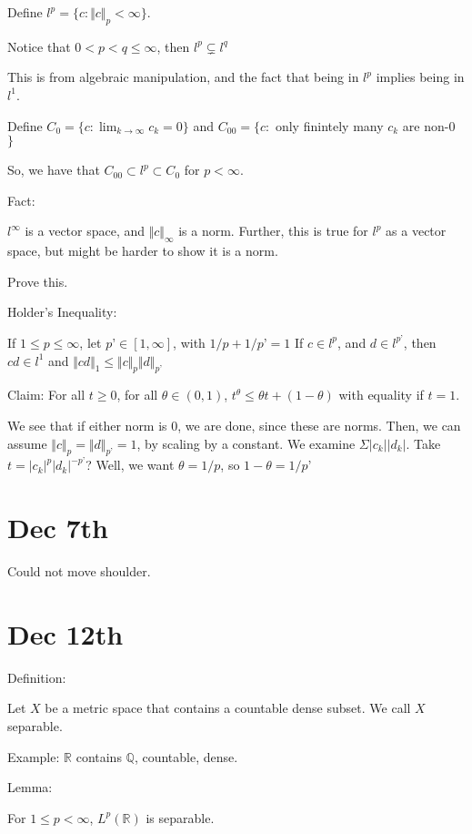 \documentclass[10pt]{article}
\begin{document}
Define $l^p = \{ c : \Vert c \Vert_p < \infty \}$.

Notice that $0 < p < q \leq \infty$, then $l^p \subsetneq l^q$

This is from algebraic manipulation, and the fact that being in $l^p$ implies being in $l^1$.

Define $C_0 = \{ c : \lim_{k \to \infty} c_k = 0\}$ and $C_{00} = \{ c : $ only finintely many $c_k$ are non-0 $\}$

So, we have that $C_{00} \subset l^p \subset C_0$ for $p < \infty$.

Fact:

$l^\infty$ is a vector space, and $\Vert c \Vert_\infty$ is a norm. Further, this is true for $l^p$ as a vector space, but might be harder to show it is a norm.

Prove this.

Holder’s Inequality:

If $1 \leq p \leq \infty$, let $p’ \in [1,\infty]$, with $1/p + 1/p’ = 1$ If $c \in l^p$, and $d \in l^{p’}$, then $cd \in l^1$ and $\Vert cd \Vert_1 \leq \Vert c \Vert_p \Vert d \Vert_{p’}$

Claim: For all $ t \geq 0$, for all $\theta \in (0,1)$, $t^\theta \leq \theta t + (1 - \theta)$ with equality if $t = 1$.

We see that if either norm is 0, we are done, since these are norms. Then, we can assume $\Vert c \Vert_p = \Vert d \Vert_{p’} = 1$, by scaling by a constant. We examine $\Sigma |c_k| |d_k|$. Take $t = |c_k|^p|d_k|^{-p’}$? Well, we want $\theta = 1/p$, so $1 - \theta = 1/p’$

\section*{Dec  7th}

Could not move shoulder.

\section*{Dec 12th}

Definition:

Let $X$ be a metric space that contains a countable dense subset. We call $X$ separable.

Example: $\mathbb{R}$ contains $\mathbb{Q}$, countable, dense.

Lemma:

For $1 \leq p < \infty$, $L^p(\mathbb{R})$ is separable.
\end{document}
